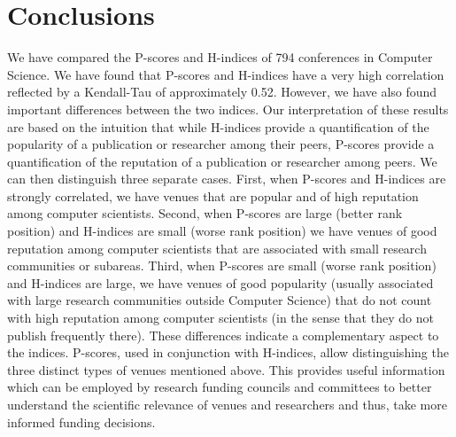 \documentclass[notitlepage]{svjour3}
\begin{document}

\section{Conclusions}
\label{sec:conclusions}

We have compared the P-scores and H-indices of 794 conferences in Computer Science. 
We have found that P-scores and H-indices have a very high correlation reflected by a Kendall-Tau of 
approximately 0.52. However,
we have also found important differences between the two indices.
Our interpretation of these results are based on the intuition that while H-indices provide a quantification of the popularity of a publication or researcher among their peers, P-scores provide a quantification of the reputation of a publication or researcher among peers. We can then distinguish three separate cases. First, when P-scores and H-indices are strongly correlated, we have venues that are popular and of high reputation among computer scientists. Second, when P-scores are large (better rank position) and H-indices are small (worse rank position) we have venues of good reputation among computer scientists that are associated with small research communities or subareas. Third, when P-scores are small (worse rank position) and H-indices are large, we have venues of good popularity (usually associated with large research communities outside Computer Science) that do not count with high reputation among computer scientists (in the sense that they do not publish frequently there).
These differences indicate a complementary aspect to the indices. P-scores, used in conjunction with H-indices, allow distinguishing the three distinct types of venues mentioned above. This provides useful information which
can be employed
by research funding councils and committees to better understand 
the scientific relevance of venues and researchers and thus, take more informed funding decisions.
\end{document}

